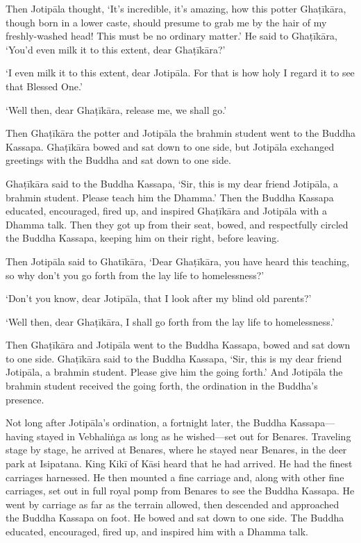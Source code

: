 \documentclass[12pt,openany]{book}%
\begin{document}
Then \textsanskrit{Jotipāla} thought, ‘It’s incredible, it’s amazing, how this potter \textsanskrit{Ghaṭīkāra}, though born in a lower caste, should presume to grab me by the hair of my freshly-washed head! This must be no ordinary matter.’ He said to \textsanskrit{Ghaṭīkāra}, ‘You’d even milk it to this extent, dear \textsanskrit{Ghaṭīkāra}?’ 

‘I even milk it to this extent, dear \textsanskrit{Jotipāla}. For that is how holy I regard it to see that Blessed One.’ 

‘Well then, dear \textsanskrit{Ghaṭīkāra}, release me, we shall go.’ 

Then \textsanskrit{Ghaṭīkāra} the potter and \textsanskrit{Jotipāla} the brahmin student went to the Buddha Kassapa. \textsanskrit{Ghaṭīkāra} bowed and sat down to one side, but \textsanskrit{Jotipāla} exchanged greetings with the Buddha and sat down to one side. 

\textsanskrit{Ghaṭīkāra} said to the Buddha Kassapa, ‘Sir, this is my dear friend \textsanskrit{Jotipāla}, a brahmin student. Please teach him the Dhamma.’ Then the Buddha Kassapa educated, encouraged, fired up, and inspired \textsanskrit{Ghaṭīkāra} and \textsanskrit{Jotipāla} with a Dhamma talk. Then they got up from their seat, bowed, and respectfully circled the Buddha Kassapa, keeping him on their right, before leaving. 

Then \textsanskrit{Jotipāla} said to \textsanskrit{Ghatīkāra}, ‘Dear \textsanskrit{Ghaṭīkāra}, you have heard this teaching, so why don’t you go forth from the lay life to homelessness?’ 

‘Don’t you know, dear \textsanskrit{Jotipāla}, that I look after my blind old parents?’ 

‘Well then, dear \textsanskrit{Ghaṭīkāra}, I shall go forth from the lay life to homelessness.’ 

Then \textsanskrit{Ghaṭīkāra} and \textsanskrit{Jotipāla} went to the Buddha Kassapa, bowed and sat down to one side. \textsanskrit{Ghaṭīkāra} said to the Buddha Kassapa, ‘Sir, this is my dear friend \textsanskrit{Jotipāla}, a brahmin student. Please give him the going forth.’ And \textsanskrit{Jotipāla} the brahmin student received the going forth, the ordination in the Buddha’s presence. 

Not long after \textsanskrit{Jotipāla}’s ordination, a fortnight later, the Buddha Kassapa—having stayed in \textsanskrit{Vebhaliṅga} as long as he wished—set out for Benares. Traveling stage by stage, he arrived at Benares, where he stayed near Benares, in the deer park at Isipatana. King \textsanskrit{Kikī} of \textsanskrit{Kāsi} heard that he had arrived. He had the finest carriages harnessed. He then mounted a fine carriage and, along with other fine carriages, set out in full royal pomp from Benares to see the Buddha Kassapa. He went by carriage as far as the terrain allowed, then descended and approached the Buddha Kassapa on foot. He bowed and sat down to one side. The Buddha educated, encouraged, fired up, and inspired him with a Dhamma talk. 
\end{document}
